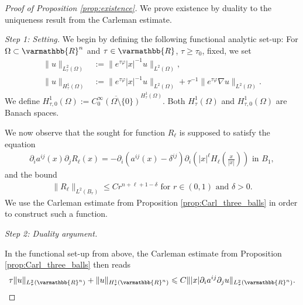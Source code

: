 \documentclass[12pt,twoside]{amsart}
\numberwithin{equation}{section}
\renewcommand{\leq}{\leqslant}
\renewcommand{\geq}{\geqslant}
\renewcommand{\mathbb}{\varmathbb}
\newcommand {\R} {\mathbb{R}} \newcommand {\Z} {\mathbb{Z}}
\newcommand {\p} {\partial}
\begin{document}
\begin{appendix}
\begin{proof}[Proof of Proposition \ref{prop:existence}]

We prove existence by duality to the uniqueness result from the Carleman estimate.

\emph{Step 1: Setting.}
We begin by defining the following functional analytic set-up: For $\Omega \subset \R^n$ and $\tau \in \R$, $\tau \geq \tau_0$, fixed, we set
\begin{align*}
\|u\|_{L^2_{\tau}(\Omega)} &:= \|e^{\tau \varphi}|x|^{-1} u\|_{L^2(\Omega)},\\
\|u\|_{H^1_{\tau}(\Omega)} &:= \|e^{\tau \varphi}|x|^{-1} u\|_{L^2(\Omega)} + \tau^{-1}\|e^{\tau \varphi} \nabla u\|_{L^2(\Omega)}.
\end{align*}
We define $H^1_{\tau,0}(\Omega):= \overline{C_0^{\infty}(\Omega\setminus \{0\})}^{H^1_{\tau}(\Omega)}$.
Both $H^1_{\tau}(\Omega)$ and $H^{1}_{\tau,0}(\Omega)$ are Banach spaces. 

We now observe that the sought for function $R_{\ell}$ is supposed to satisfy the equation
\begin{align*}
\p_i a^{ij}(x) \p_j R_{\ell}(x) = - \p_i (a^{ij}(x)-\delta^{ij})\p_i (|x|^{\ell}H_{\ell}(\frac{x}{|x|})) \mbox{ in } B_{1},
\end{align*} 
and the bound
\begin{align*}
\|R_{\ell}\|_{L^2(B_{r})} \leq C r^{n+\ell + 1-\delta} \mbox{ for } r \in (0,1) \mbox{ and } \delta>0.
\end{align*}
We use the Carleman estimate from Proposition \ref{prop:Carl_three_balls} in order to construct such a function.

\medskip


\emph{Step 2: Duality argument.}

In the functional set-up from above, the Carleman estimate from Proposition \ref{prop:Carl_three_balls} then reads
\begin{align}
\label{eq:Carl_aux}
\tau \|u\|_{L^2_{\tau}(\R^n)} +  \|u\|_{H^1_{\tau}(\R^n)}\leq C  \||x| \p_i a^{ij} \p_j u\|_{L^2_{\tau}(\R^n)}.
\end{align}



\end{proof}
\end{appendix}
\end{document}
